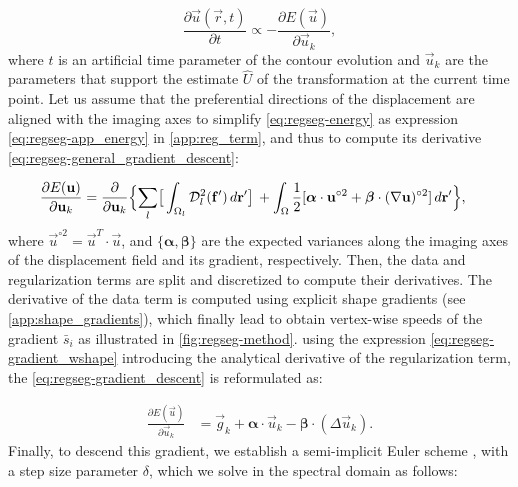   \begin{equation}
  \frac{\partial \vec{u}(\vec{r},t)}{\partial t} \propto - \frac{\partial E(\vec{u})}{\partial \vec{u}_k},
  \label{eq:regseg-general_gradient_descent}
  \end{equation}
  where $t$ is an artificial time parameter of the contour
  evolution and $\vec{u}_k$ are the parameters that support the estimate
  $\hat{U}$ of the transformation at the current time point.
Let us assume that the preferential directions of
  the displacement are aligned with the imaging axes to simplify \eqref{eq:regseg-energy} as expression 
  \eqref{eq:regseg-app_energy} in \ref{app:reg_term}, and thus to compute its
  derivative \eqref{eq:regseg-general_gradient_descent}:

  \begin{align}
  \frac{\partial E(\vec{u})}{\partial \vec{u}_k} &=
  \frac{ \partial }{\partial \vec{u}_k} \Big\{
  \underset{l}{\sum} \big[ \int_{\Omega_l} \mdist{f'}{l} \,d\vec{r}' \big] \,
  + \int_{\Omega} \frac12 [ \boldsymbol{\alpha} \cdot \vec{u}^{\circ2}
  + \boldsymbol{\beta} \cdot (\nabla \vec{u})^{\circ2} ] \,d\vec{r}'
  \Big\},
  \label{eq:regseg-gradient_descent}
  \end{align}
  where $\vec{u}^{\circ2} = \vec{u}^T \cdot \vec{u}$,
  and $\{\boldsymbol{\alpha}, \boldsymbol{\beta}\}$ are the expected variances along
  the imaging axes of the displacement field and its gradient, respectively.
Then, the data and regularization terms are split and discretized to compute their
  derivatives.
The derivative of the data term is computed using explicit shape gradients (see \ref{app:shape_gradients}),
  which finally lead to obtain vertex-wise speeds of the gradient $\bar{s}_i$ as
  illustrated in \autoref{fig:regseg-method}.
%
using the expression \eqref{eq:regseg-gradient_wshape}
 introducing the analytical derivative of the regularization term,
  the \autoref{eq:regseg-gradient_descent} is reformulated as:

  \begin{align}
  \frac{\partial E(\vec{u})}{\partial \vec{u}_k} &=
  \vec{g}_k  + \boldsymbol{\alpha} \cdot \vec{u}_k - \boldsymbol{\beta} \cdot (\Delta \vec{u}_k).
  \label{eq:regseg-final_gradient}
  \end{align}
Finally, to descend this gradient, we establish a semi-implicit Euler scheme
  ,
  with a step size parameter $\delta$, which we solve in the spectral domain as follows:


